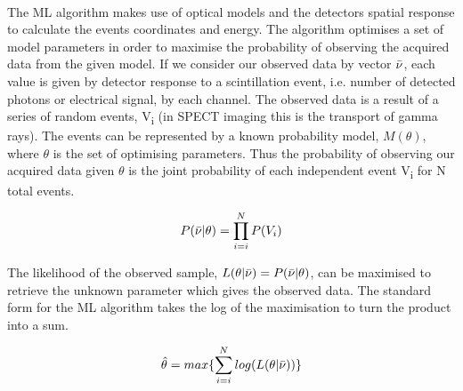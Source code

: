 \paragraph{}
The \acrshort{ML} algorithm makes use of optical models and the detectors spatial response to calculate the events coordinates and energy. The algorithm optimises a set of model parameters in order to maximise the probability of observing the acquired data from the given model. If we consider our observed data by vector $\Bar{\nu}$, each value is given by detector response to a scintillation event, i.e. number of detected photons or electrical signal, by each channel. The observed data is a result of a series of random events, V\textsubscript{i} (in \acrshort{SPECT} imaging this is the transport of gamma rays). The events can be represented by a known probability model, $M(\theta)$, where $\theta$ is the set of optimising parameters. Thus the probability of observing our acquired data given $\theta$ is the joint probability of each independent event V\textsubscript{i} for N total events. 

\begin{equation} \label{eqn:MLProb}
                P(\Bar{\nu}|\theta) = \prod^{N}_{i=i}P(V_i)
\end{equation}

The likelihood of the observed sample, $L(\theta|\Bar{\nu}) = P(\Bar{\nu}|\theta)$, can be maximised to retrieve the unknown parameter which gives the observed data. The standard form for the \acrshort{ML} algorithm takes the log of the maximisation to turn the product into a sum. 

\begin{equation} \label{eqn:ML}
                \hat{\theta} = max\{\sum^{N}_{i=i}log(L(\theta|\Bar{\nu}))\}
\end{equation}


